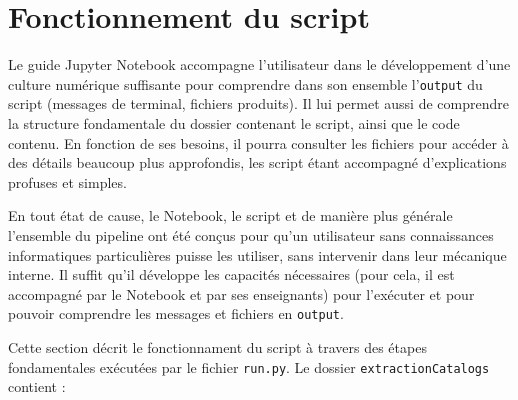 \documentclass[a4paper,12pt,twoside]{book}
\begin{document}
\section{Fonctionnement du script}

Le guide Jupyter Notebook accompagne l'utilisateur dans le développement d'une culture numérique suffisante pour comprendre dans son ensemble l'\texttt{output} du script (messages de terminal, fichiers produits). Il lui permet aussi de comprendre la structure fondamentale du dossier contenant le script, ainsi que le code contenu. En fonction de ses besoins, il pourra consulter les fichiers pour accéder à des détails beaucoup plus approfondis, les script étant accompagné d'explications profuses et simples.

En tout état de cause, le Notebook, le script et de manière plus générale l'ensemble du pipeline ont été conçus pour qu'un utilisateur sans connaissances informatiques particulières puisse les utiliser, sans intervenir dans leur mécanique interne. Il suffit qu'il développe les capacités nécessaires (pour cela, il est accompagné par le Notebook et par ses enseignants) pour l'exécuter et pour pouvoir comprendre les messages et fichiers en \texttt{output}.

Cette section décrit le fonctionnament du script à travers des étapes fondamentales exécutées par le fichier \texttt{run.py}. Le dossier \texttt{extractionCatalogs} contient :
\end{document}

